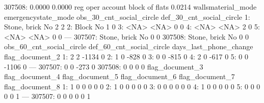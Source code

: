 \documentclass[a4paper]{article}
\begin{document}
\begin{Schunk}
\begin{Soutput}
307508:                   0.0000             0.0000   reg oper account block of flats         0.0214
        wallsmaterial_mode emergencystate_mode obs_30_cnt_social_circle def_30_cnt_social_circle
     1:       Stone, brick                  No                        2                        2
     2:              Block                  No                        1                        0
     3:               <NA>                <NA>                        0                        0
     4:               <NA>                <NA>                        2                        0
     5:               <NA>                <NA>                        0                        0
    ---                                                                                         
307507:       Stone, brick                  No                        0                        0
307508:       Stone, brick                  No                        0                        0
        obs_60_cnt_social_circle def_60_cnt_social_circle days_last_phone_change flag_document_2
     1:                        2                        2                  -1134               0
     2:                        1                        0                   -828               0
     3:                        0                        0                   -815               0
     4:                        2                        0                   -617               0
     5:                        0                        0                  -1106               0
    ---                                                                                         
307507:                        0                        0                   -273               0
307508:                        0                        0                      0               0
        flag_document_3 flag_document_4 flag_document_5 flag_document_6 flag_document_7 flag_document_8
     1:               1               0               0               0               0               0
     2:               1               0               0               0               0               0
     3:               0               0               0               0               0               0
     4:               1               0               0               0               0               0
     5:               0               0               0               0               0               1
    ---                                                                                                
307507:               0               0               0               0               0               1

\end{Soutput}
\end{Schunk}
\end{document}
